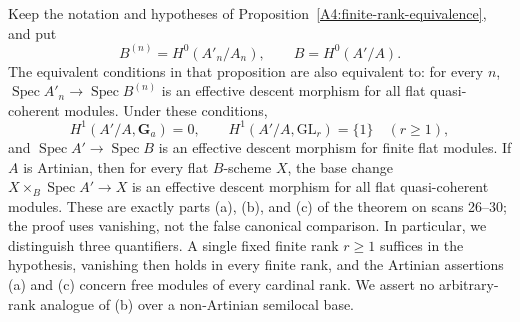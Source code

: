 \begin{theorem}
\label{A4:finite-descent-theorem}
Keep the notation and hypotheses of
Proposition~\ref{A4:finite-rank-equivalence}, and put
\[
 B^{(n)}=H^0(A'_n/A_n),\qquad B=H^0(A'/A).
\]
The equivalent conditions in that proposition are also equivalent to:
for every $n$, $\operatorname{Spec}A'_n\to\operatorname{Spec}B^{(n)}$
is an effective descent morphism for all flat quasi-coherent modules.
Under these conditions,
\[
 H^1(A'/A,\mathbf G_a)=0,\qquad
 H^1(A'/A,\mathrm{GL}_r)=\{1\}\quad(r\geq1),
\]
and $\operatorname{Spec}A'\to\operatorname{Spec}B$ is an effective
descent morphism for finite flat modules.
If $A$ is Artinian, then for every flat $B$-scheme $X$, the base change
$X\times_B\operatorname{Spec}A'\to X$ is an effective descent morphism
for all flat quasi-coherent modules.
These are exactly parts (a), (b), and (c) of the theorem on scans 26--30;
the proof uses vanishing, not the false canonical comparison.
In particular, we distinguish three quantifiers.  A single fixed finite
rank $r\geq1$ suffices in the hypothesis, vanishing then holds in every
finite rank, and the Artinian assertions (a) and (c) concern free modules
of every cardinal rank.  We assert no arbitrary-rank analogue of (b)
over a non-Artinian semilocal base.
\end{theorem}
